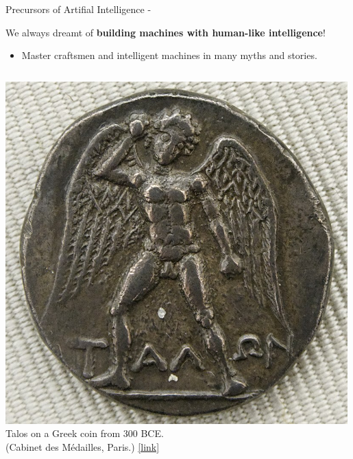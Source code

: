 %
%
%

\begin{frame}[t, allowframebreaks]{Precursors of Artifial Intelligence -}

    \vspace{-0.1cm}
    We always dreamt of {\bf building machines with human-like intelligence}!\\
    \begin{itemize}
        \small
        \item
        Master craftsmen and intelligent machines in many myths and stories.\\
    \end{itemize}
    \vspace{-0.4cm}

    \begin{columns}[t]
        \begin{column}{0.46\textwidth}
         \begin{center}
          \includegraphics[width=0.99\textwidth]{./images/precursors/talos.jpg}\\
          {\scriptsize 
          \vspace{0.1cm}
          Talos on a Greek coin from 300 BCE.\\
          \color{col:attribution} 
          (Cabinet des Médailles, Paris.)
          \href{https://en.wikipedia.org/wiki/Talos\#/media/File:Didrachm_Phaistos_obverse_CdM.jpg}{\tiny [link]}
}
\end{center}
\end{column}
\end{columns}
\end{frame}
